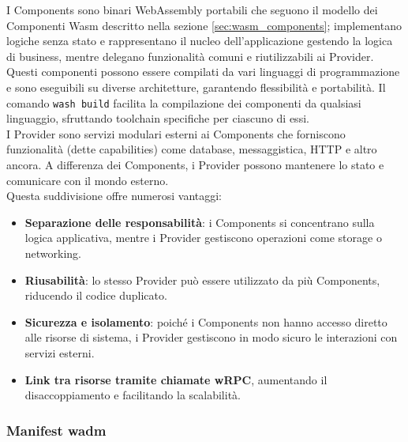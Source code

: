 I Components sono binari WebAssembly portabili che seguono il modello dei Componenti Wasm descritto nella sezione \ref{sec:wasm_components}; implementano logiche senza stato e rappresentano il nucleo dell'applicazione gestendo la logica di business, mentre delegano funzionalità comuni e riutilizzabili ai Provider.\\
Questi componenti possono essere compilati da vari linguaggi di programmazione e sono eseguibili su diverse architetture, garantendo flessibilità e portabilità. Il comando \texttt{wash build} facilita la compilazione dei componenti da qualsiasi linguaggio, sfruttando toolchain specifiche per ciascuno di essi.\\
I Provider sono servizi modulari esterni ai Components che forniscono funzionalità (dette capabilities) come database, messaggistica, HTTP e altro ancora. A differenza dei Components, i Provider possono mantenere lo stato e comunicare con il mondo esterno.\\
Questa suddivisione offre numerosi vantaggi:
\begin{itemize}
    \item \textbf{Separazione delle responsabilità}: i Components si concentrano sulla logica applicativa, mentre i Provider gestiscono operazioni come storage o networking.
    \item \textbf{Riusabilità}: lo stesso Provider può essere utilizzato da più Components, riducendo il codice duplicato.
    \item \textbf{Sicurezza e isolamento}: poiché i Components non hanno accesso diretto alle risorse di sistema, i Provider gestiscono in modo sicuro le interazioni con servizi esterni.
    \item \textbf{Link tra risorse tramite chiamate wRPC}, aumentando il disaccoppiamento e facilitando la scalabilità.
\end{itemize}

\subsubsection{Manifest wadm}

